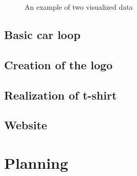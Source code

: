 \documentclass[12pt]{article}
\begin{document}
\begin{figure}[h] 
    \centering
    \hfill%
    \caption{An example of two visualized data}
\end{figure}

\subsection{Basic car loop}

\subsection{Creation of the logo}

\subsection{Realization of t-shirt}

\subsection{Website}


\section {Planning}
\end{document}
